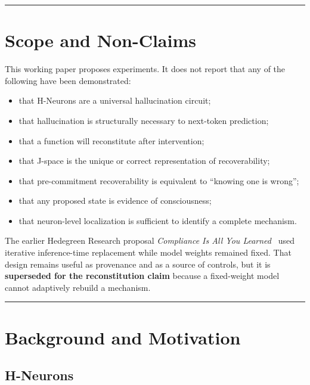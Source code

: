 \begin{center}\rule{0.5\linewidth}{0.5pt}\end{center}

\section{Scope and Non-Claims}\label{scope-and-non-claims}

This working paper proposes experiments. It does not report that any of the following have been demonstrated:

\begin{itemize}
\tightlist
\item
  that H-Neurons are a universal hallucination circuit;
\item
  that hallucination is structurally necessary to next-token prediction;
\item
  that a function will reconstitute after intervention;
\item
  that J-space is the unique or correct representation of recoverability;
\item
  that pre-commitment recoverability is equivalent to ``knowing one is wrong'';
\item
  that any proposed state is evidence of consciousness;
\item
  that neuron-level localization is sufficient to identify a complete mechanism.
\end{itemize}

The earlier Hedegreen Research proposal \emph{Compliance Is All You Learned}~\parencite{hedegreen2026compliance} used iterative inference-time replacement while model weights remained fixed. That design remains useful as provenance and as a source of controls, but it is \textbf{superseded for the reconstitution claim} because a fixed-weight model cannot adaptively rebuild a mechanism.

\begin{center}\rule{0.5\linewidth}{0.5pt}\end{center}

\section{Background and Motivation}\label{background-and-motivation}

\subsection{H-Neurons}\label{h-neurons}

